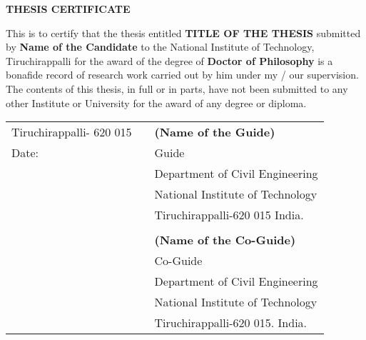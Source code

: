 \thispagestyle{plain}
\begin{center}
\textbf{\textbf{\fontsize{16pt}{24pt}\selectfont THESIS CERTIFICATE}}
\end{center}

\vspace{0.3cm}
\fontsize{12pt}{18pt}\selectfont This is to certify that the thesis entitled \textbf{TITLE OF THE THESIS} submitted by \textbf{Name of the
Candidate} to the National Institute of Technology, Tiruchirappalli for the award of the
degree of \textbf{Doctor of Philosophy} is a bonafide record of research work carried out by him
under my / our supervision. The contents of this thesis, in full or in parts, have not been
submitted to any other Institute or University for the award of any degree or diploma. 

\vspace{2cm}

\begin{tabularx}{\textwidth}{ l c l }
Tiruchirappalli- 620 015 & \hfill & \textbf{(Name of the Guide)}\\
Date: & \hspace{1.6cm} & Guide\\
  &  & Department of Civil Engineering\\
  &  & National Institute of Technology\\
  &  & Tiruchirappalli-620 015 India.\\
  & \vspace{2cm}  &  \\
  &  & \textbf{(Name of the Co-Guide)}\\
  &  & Co-Guide\\
  &  & Department of Civil Engineering\\
  &  & National Institute of Technology\\
  &  & Tiruchirappalli-620 015. India.
\end{tabularx}

\newpage
